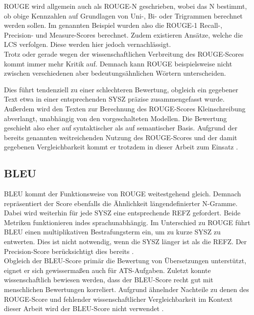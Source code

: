 \noindent
\ac{ROUGE} wird allgemein auch als \ac{ROUGE}-N geschrieben, wobei das N bestimmt, ob obige Kennzahlen auf Grundlagen von Uni-, Bi- oder Trigrammen berechnet werden sollen. Im genannten Beispiel wurden also die \ac{ROUGE}-1 Recall-, Precision- und Measure-Scores berechnet. Zudem existieren Ansätze, welche die \ac{LCS} verfolgen. Diese werden hier jedoch vernachlässigt.
\\

\noindent
Trotz oder gerade wegen der wissenschaftlichen Verbreitung des \ac{ROUGE}-Scores kommt immer mehr Kritik auf. Demnach kann \ac{ROUGE} beispielsweise nicht zwischen verschiedenen aber bedeutungsähnlichen Wörtern unterscheiden.
\newpage

\noindent
Dies führt tendenziell zu einer schlechteren Bewertung, obgleich ein gegebener Text etwa in einer entsprechenden \ac{SYSZ} präzise zusammengefasst wurde. Außerdem wird den Texten zur Berechnung des \ac{ROUGE}-Scores Kleinschreibung abverlangt, unabhängig von den vorgeschalteten Modellen. Die Bewertung geschieht also eher auf syntaktischer als auf semantischer Basis. Aufgrund der bereits genannten weitreichenden Nutzung des \ac{ROUGE}-Scores und der damit gegebenen Vergleichbarkeit kommt er trotzdem in dieser Arbeit zum Einsatz \cite[S.~5]{LIN04}.

	
\subsection{BLEU}
\noindent
\ac{BLEU} kommt der Funktionsweise von \ac{ROUGE} weitestgehend gleich. Demnach repräsentiert der Score ebenfalls die Ähnlichkeit längendefinierter N-Gramme. Dabei wird weiterhin für jede \ac{SYSZ} eine entsprechende \ac{REFZ} gefordert. Beide Metriken funktionieren indes sprachunabhängig. Im Unterschied zu \ac{ROUGE} führt \ac{BLEU} einen multiplikativen Bestrafungsterm ein, um zu kurze \ac{SYSZ} zu entwerten. Dies ist nicht notwendig, wenn die \ac{SYSZ} länger ist als die \ac{REFZ}. Der Precision-Score berücksichtigt dies bereits \cite[S.~5]{PAP02}.\\

\noindent
Obgleich der \ac{BLEU}-Score primär die Bewertung von Übersetzungen unterstützt, eignet er sich gewissermaßen auch für \ac{ATS}-Aufgaben. Zuletzt konnte wissenschaftlich bewiesen werden, dass der \ac{BLEU}-Score recht gut mit menschlichen Bewertungen korreliert. Aufgrund ähnelnder Nachteile zu denen des \ac{ROUGE}-Score und fehlender wissenschaftlicher Vergleichbarkeit im Kontext dieser Arbeit wird der \ac{BLEU}-Score nicht verwendet \cite[S.~6-7]{PAP02}.


